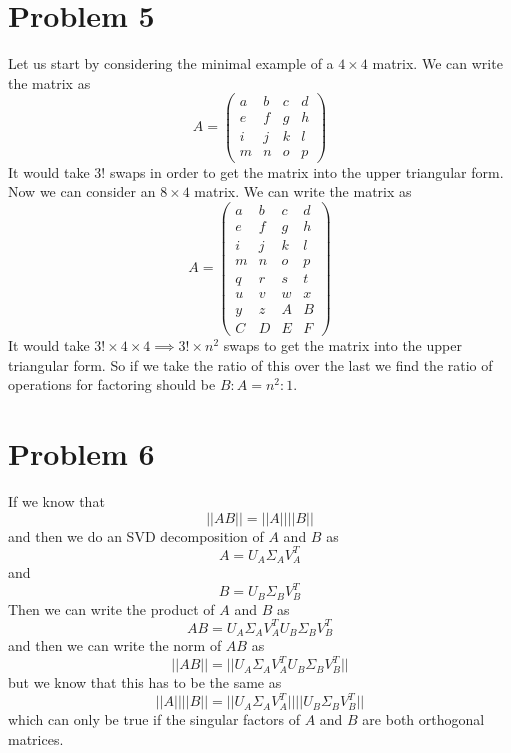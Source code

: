 \documentclass{article}
\begin{document}
\section{Problem 5}
Let us start by considering the minimal example of a $4 \times 4$ matrix. We can write the matrix as
\begin{equation}
    A = \begin{pmatrix}
        a & b & c & d \\
        e & f & g & h \\
        i & j & k & l \\
        m & n & o & p
    \end{pmatrix}
\end{equation}
It would take $3!$ swaps in order to get the matrix into the upper triangular form. Now we can consider an $8\times 4$ matrix. We can write the matrix as
\begin{equation}
    A = \begin{pmatrix}
        a & b & c & d \\
        e & f & g & h \\
        i & j & k & l \\
        m & n & o & p \\
        q & r & s & t \\
        u & v & w & x \\
        y & z & A & B \\
        C & D & E & F
    \end{pmatrix}
\end{equation}
It would take $3!\times 4\times 4 \implies 3!\times n^2$ swaps to get the matrix into the upper triangular form. So if we take the ratio of this over the last we find the ratio of operations for factoring should be $B:A = n^2:1$.
\section{Problem 6}
If we know that
\begin{equation}
    ||AB|| = ||A|| ||B||
\end{equation}
and then we do an SVD decomposition of $A$ and $B$ as
\begin{equation}
    A = U_A \Sigma_A V_A^T
\end{equation}
and
\begin{equation}
    B = U_B \Sigma_B V_B^T
\end{equation}
Then we can write the product of $A$ and $B$ as
\begin{equation}
    AB = U_A \Sigma_A V_A^T U_B \Sigma_B V_B^T
\end{equation}
and then we can write the norm of $AB$ as
\begin{equation}
    ||AB|| = ||U_A \Sigma_A V_A^T U_B \Sigma_B V_B^T||
\end{equation}
but we know that this has to be the same as
\begin{equation}
    ||A|| ||B|| = ||U_A \Sigma_A V_A^T|| ||U_B \Sigma_B V_B^T||
\end{equation}
which can only be true if the singular factors of $A$ and $B$ are both orthogonal matrices.
\end{document}
